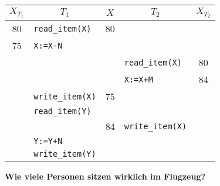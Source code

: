 \begin{frame}{\insertsection}
\framesubtitle{\insertsubsection}
\begin{center}
\begin{tabular}{c|p{3.5cm}|c|p{3.5cm}|c}
	$X_{T_1}$ & \multicolumn{1}{c|}{$T_1$} & $X$ & \multicolumn{1}{c|}{$T_2$} & $X_{T_2}$ \\\hline
	80 & \texttt{read\_item(X)} & 80 & &\\
	75 & \texttt{X:=X-N} & & & \\
	& & & \texttt{read\_item(X)} & 80 \\
	& & & \texttt{X:=X+M} & 84\\
	& \texttt{write\_item(X)} & 75 & & \\
	& \texttt{read\_item(Y)} &  & & \\
	& & \cellcolor{Red}84 & \texttt{write\_item(X)} & \\
	& \texttt{Y:=Y+N} &  & & \\
	& \texttt{write\_item(Y)} &&&\\
\end{tabular}
\end{center}
\textbf{Wie viele Personen sitzen wirklich im Flugzeug?}
\end{frame}


